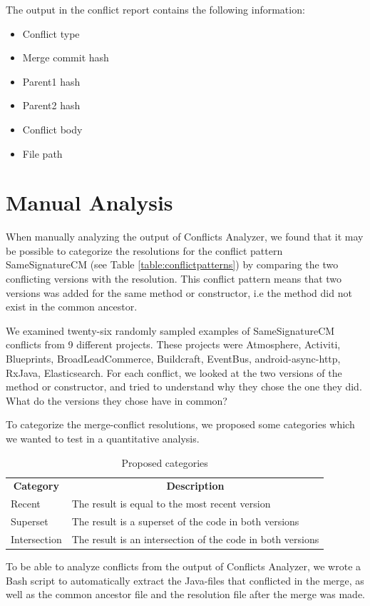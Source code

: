 The output in the conflict report contains the following information:
\begin{itemize}
\item Conflict type
\item Merge commit hash
\item Parent1 hash
\item Parent2 hash
\item Conflict body
\item File path
\end{itemize}

\section{Manual Analysis}\label{sec:manual}
\FloatBarrier
When manually analyzing the output of Conflicts Analyzer, we found that it may be possible to categorize the resolutions for the conflict pattern SameSignatureCM (see Table \ref{table:conflictpatterns}) by comparing the two conflicting versions with the resolution. This conflict pattern means that two versions was added for the same method or constructor, i.e the method did not exist in the common ancestor.

We examined twenty-six randomly sampled examples of SameSignatureCM conflicts from 9 different projects. These projects were Atmosphere, Activiti, Blueprints, BroadLeadCommerce, Buildcraft, EventBus, android-async-http, RxJava, Elasticsearch. For each conflict, we looked at the two versions of the method or constructor, and tried to understand why they chose the one they did. What do the versions they chose have in common?

To categorize the merge-conflict resolutions, we proposed some categories which we wanted to test in a quantitative analysis.
\begin{table}
\caption{Proposed categories}\label{table:pcategories}
\begin{tabular}{ p{7cm} p{7cm} }
\hline
\multicolumn{1}{c}{\textbf{Category}} & \multicolumn{1}{c}{\textbf{Description}}\\
Recent & The result is equal to the most recent version\\
Superset & The result is a superset of the code in both versions\\
Intersection & The result is an intersection of the code in both versions\\
\end{tabular}
\end{table}
\FloatBarrier
To be able to analyze conflicts from the output of Conflicts Analyzer, we wrote a Bash script to automatically extract the Java-files that conflicted in the merge, as well as the common ancestor file and the resolution file after the merge was made.

